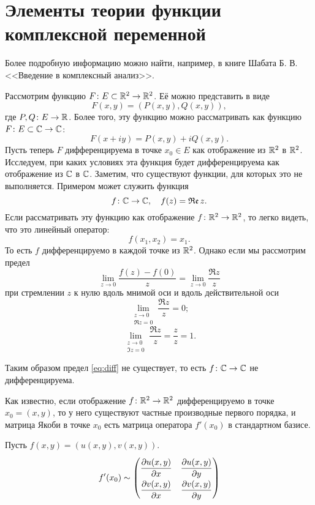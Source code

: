 \section{Элементы теории функции комплексной переменной}
Более подробную информацию можно найти, например, в книге Шабата Б. В. <<Введение
в комплексный анализ>>.

Рассмотрим функцию $F \colon E \subset \mathbb{R}^2 \to \mathbb{R}^2$. Её можно представить в виде
\[ F(x, y) = (P(x, y), Q(x, y)), \]
где $P, Q \colon E \to \mathbb{R}$. Более того, эту функцию можно рассматривать как
функцию $F \colon E \subset \mathbb{C} \to \mathbb{C}$:
\[ F(x + iy) = P(x, y) + i Q(x, y). \]
Пусть теперь $F$ дифференцируема в точке $x_0 \in E$ как отображение из $\mathbb{R}^2$ в $\mathbb{R}^2$.
Исследуем, при каких условиях эта функция будет дифференцируема как отображение из $\mathbb{C}$ в
$\mathbb{C}$. Заметим, что существуют функции, для которых это не выполняется. Примером может служить функция
\[f\colon \mathbb{C} \to \mathbb{C}, \quad f(z) = \operatorname{\mathfrak{Re}} z. \]
Если рассматривать эту функцию как отображение $f \colon \mathbb{R}^2 \to \mathbb{R}^2$, то легко видеть,
что это линейный оператор:
\[f(x_1, x_2) = x_1. \]
То есть $f$ дифференцируемо в каждой точке из $\mathbb{R}^2$. Однако если мы рассмотрим предел
\begin{equation}\label{eq:diff}
 \lim_{z\to 0} \frac{f(z) - f(0)}{z} = \lim_{z\to 0} \frac{\Re z}{z}
\end{equation}
при стремлении $z$ к нулю вдоль мнимой оси и вдоль действительной оси
\[ \lim_{\substack{z\to 0\\ \Re z = 0}} \frac{\Re z}{z} = 0; \]
\[ \lim_{\substack{z\to 0\\ \Im z = 0}} \frac{\Re z}{z} = \frac{z}{z} = 1. \]

Таким образом предел \eqref{eq:diff} не существует, то есть $f \colon \mathbb{C} \to \mathbb{C}$ не
дифференцируема.

Как известно, если отображение $f \colon \mathbb{R}^2 \to \mathbb{R}^2$ дифференцируемо в точке 
$x_0 = (x, y)$,
то у него существуют частные производные первого порядка, и матрица Якоби в точке $x_0$ 
есть матрица оператора $f'(x_0)$ в стандартном базисе. 

Пусть $f(x, y) = (u(x, y), v(x, y))$.
\[ f'(x_0) \sim 
    \renewcommand{\arraystretch}{2}
    \begin{pmatrix}
    \dfrac{\partial u(x, y)}{\partial x} & \dfrac{\partial u(x, y)}{\partial y} \\
    \dfrac{\partial v(x, y)}{\partial x} & \dfrac{\partial v(x, y)}{\partial y} 
    \end{pmatrix}
\]

